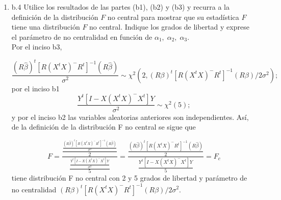 \documentclass[12pt,a4paper]{report}
\begin{document}
\begin{itemize}
\begin{enumerate}
El hecho de que la hipótesis sea comprobable implica que

\begin{equation}
R(X^tX)^{-}X^tX = R
\end{equation}

Ahora, ya que $Y$ tiene distribución normal con media $X\beta$, entonces $\widehat{\beta}=(X^tX)^{-}X^tY$ también tiene distribución normal con media
\[E(\widehat{\beta}) = (X^tX)^{-}X^tX\beta.\]
Luego, $R\widehat{\beta}$ tiene distribución normal con media
\begin{equation}
E(R\widehat{\beta}) = R(X^tX)^{-}X^tX\beta.
\end{equation}

De las ecuaciones $(1)$ y $(2)$ se deduce que
\[E(R\widehat{\beta}) = R\beta.\]

Por el Teorema 1, citado en el inciso b1., tomando $x=R\widehat{\beta}$ y $A'=[R(X^tX)^{-}R^t]^{-1}$ se concluye que 
\[\frac{(R\widehat{\beta})^t[R(X^tX)^{-}R^t]^{-1}(R\widehat{\beta})}{\sigma^2} \sim \chi^2(rango([R(X^tX)^{-}R^t]^{-1}), (R\beta)^t [R(X^tX)^{-}R^t]^{-1}(R\beta)/2\sigma^2)\]
es decir,
\[\frac{(R\widehat{\beta})^t[R(X^tX)^{-}R^t]^{-1}(R\widehat{\beta})}{\sigma^2} \sim \chi^2(2, (R\beta)^t [R(X^tX)^{-}R^t]^{-1}(R\beta)/2\sigma^2)\]

\item b.4 Utilice los resultados de las partes (b1), (b2) y (b3) y recurra a la definición de la distribución $F$ no central para mostrar que su estadística $F$ tiene una distribución $F$ no central. Indique los grados de libertad y exprese el parámetro de no centralidad en función de $\alpha_1,\;\alpha_2,\;\alpha_3$.\\

Por el inciso b3,

\[\frac{(R\widehat{\beta})^t[R(X^tX)^{-}R^t]^{-1}(R\widehat{\beta})}{\sigma^2} \sim \chi^2(2, (R\beta)^t [R(X^tX)^{-}R^t]^{-1}(R\beta)/2\sigma^2);\]
por el inciso b1
\[\frac{Y^t[I - X(X^tX)^{-}X^t]Y}{\sigma^2} \sim \chi^2(5);\]
y por el inciso b2 las variables aleatorias anteriores son independientes. Así, de la definición de la distribución F no central se sigue que

\[F=\frac{\frac{\frac{(R\widehat{\beta})^t[R(X^tX)^{-}R^t]^{-1}(R\widehat{\beta})}{\sigma^2}}{2}}{\frac{\frac{Y^t[I - X(X^tX)^{-}X^t]Y}{\sigma^2}}{5}} = \frac{\frac{(R\widehat{\beta})^t[R(X^tX)^{-}R^t]^{-1}(R\widehat{\beta})}{2}}{\frac{Y^t[I - X(X^tX)^{-}X^t]Y}{5}} = F_c\]
tiene distribución F no central con 2 y 5 grados de libertad y parámetro de no centralidad $(R\beta)^t [R(X^tX)^{-}R^t]^{-1}(R\beta)/2\sigma^2$.


\end{enumerate}
\end{itemize}
\end{document}

